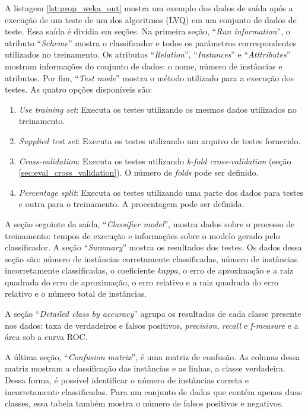 A listagem \ref{lst:prop_weka_out} mostra um exemplo dos dados de saída após a execução de um teste de um dos algoritmos (LVQ) em um conjunto de dados de teste. Essa saída é dividia em seções. Na primeira seção, ``\emph{Run information}'', o atributo ``\emph{Scheme}'' mostra o classificador e todos os parâmetros correspondentes utilizados no treinamento. Os atributos ``\emph{Relation}'', ``\emph{Instances}'' e ``\emph{Atttributes}'' mostram informações do conjunto de dados: o nome, número de instâncias e atributos. Por fim, ``\emph{Test mode}'' mostra o método utilizado para a execução dos testes. As quatro opções disponíveis são:

\begin{enumerate}
    \item \emph{Use training set}: Executa os testes utilizando os mesmos dados utilizados no treinamento.
    \item \emph{Supplied test set}: Executa os testes utilizando um arquivo de testes fornecido.
    \item \emph{Cross-validation}: Executa os testes utilizando \emph{\emph{k}-fold cross-validation} (seção \ref{sec:eval_cross_validation}). O número de \emph{folds} pode ser definido.
    \item \emph{Percentage split}: Executa os testes utilizando uma parte dos dados para testes e outra para o treinamento. A procentagem pode ser definida.
\end{enumerate}

A seção seguinte da saída, ``\emph{Classifier model}'', mostra dados sobre o processo de treinamento: tempos de execução e informações sobre o modelo gerado pelo classificador. A seção ``\emph{Summary}'' mostra os resultados dos testes. Os dados dessa seção são: número de instâncias corretamente classificadas, número de instâncias incorretamente classificadas, o coeficiente \emph{kappa}, o erro de aproximação e a raiz quadrada do erro de aproximação, o erro relativo e a raiz quadrada do erro relativo e o número total de instâncias.

A seção ``\emph{Detailed class by accuracy}'' agrupa os resultados de cada classe presente nos dados: taxa de verdadeiros e falsos positivos, \emph{precision}, \emph{recall} e \emph{f-measure} e a área sob a curva ROC.

A última seção, ``\emph{Confusion matrix}'', é uma matriz de confusão. As colunas dessa matriz mostram a classificação das instâncias e as linhas, a classe verdadeira. Dessa forma, é possível identificar o número de instâncias correta e incorretamente classificadas. Para um conjunto de dados que contém apenas duas classes, essa tabela também mostra o número de falsos positivos e negativos.

